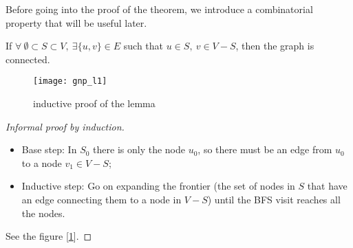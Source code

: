     Before going into the proof of the theorem, we introduce a combinatorial property that will be useful later.
    
    \begin{lem}\label{l:gnp-connectivity}
        If $\forall\ \emptyset \subset S \subset V,\ \exists \{u,v\} \in E$ such that $u\in S,\ v \in V-S$, then the graph is connected.
    \end{lem}

    \begin{figure}[h!]
        \centering
        \texttt{[image: gnp\_l1]}
        \caption{inductive proof of the lemma}
        \label{fig:gnp-l1}
    \end{figure}

    \begin{proof}[Informal proof by induction] \
        \begin{itemize}
            \item Base step: In $S_0$ there is only the node $u_0$, so there must be an edge from $u_0$ to a node $v_1 \in V-S$;
            \item Inductive step: Go on expanding the frontier (the set of nodes in $S$ that have an edge connecting them to a node in $V-S$) until the BFS visit reaches all the nodes.
        \end{itemize}
    
        See the figure [\ref{fig:gnp-l1}].
    \end{proof}


